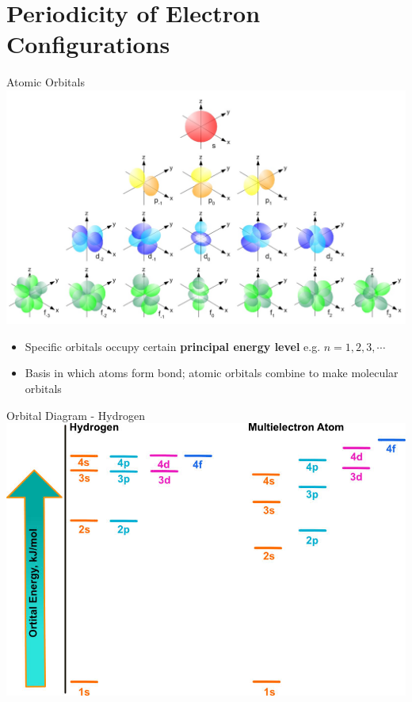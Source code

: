 \documentclass[11pt]{beamer}
\begin{document}
\section{Periodicity of Electron Configurations}

\begin{frame}{Atomic Orbitals}
  \centering
  \includegraphics[width=0.8\linewidth]{single_elect_orb}
  \begin{itemize}
  \item Specific orbitals occupy certain \textbf{principal energy level} e.g.
    $n = 1, 2, 3, \cdots$
  \item Basis in which atoms form bond; atomic orbitals combine to make
    molecular orbitals
  \end{itemize}
\end{frame}

\begin{frame}{Orbital Diagram - Hydrogen}
  \centering
  \includegraphics[scale=1.5,trim={0 0 1.2in 0},clip]{orbital_energy}
\end{frame}
\end{document}
